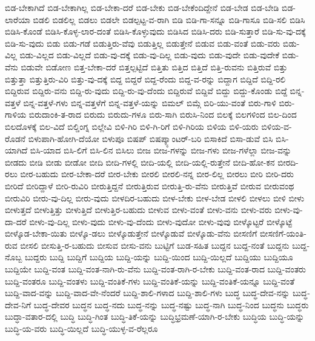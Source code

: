 {ಬಿಡ-ಬೇಕಾಗಿದೆ
ಬಿಡ-ಬೇಕಾಗಿಲ್ಲ
ಬಿಡ-ಬೇಕಾ-ದರೆ
ಬಿಡ-ಬೇಕು
ಬಿಡ-ಬೇಕೆಂದಿದ್ದೇನೆ
ಬಿಡ-ಬೇಡ
ಬಿಡ-ಬೇಡಿ
ಬಿಡ-ಲಾರೆಯಾ
ಬಿಡಲಿ
ಬಿಡಲಿಲ್ಲ
ಬಿಡಲು
ಬಿಡಲೇ
ಬಿಡಲ್ಪಟ್ಟ-ವ-ರಾಗಿ
ಬಿಡಿ
ಬಿಡಿ-ಗಾ-ಸನ್ನೂ
ಬಿಡಿ-ಗಾಸೂ
ಬಿಡಿ-ಸಲಿ
ಬಿಡಿಸಿ
ಬಿಡಿಸಿ-ಕೊಂಡೆ
ಬಿಡಿಸಿ-ಕೊಳ್ಳ-ಲಾರ-ದಂತೆ
ಬಿಡಿಸಿ-ಕೊಳ್ಳುವುದು
ಬಿಡಿಸಿದ
ಬಿಡಿಸಿ-ದರು
ಬಿಡಿ-ಸುತ್ತಾರೆ
ಬಿಡಿ-ಸು-ವು-ದಕ್ಕೆ
ಬಿಡಿ-ಸು-ವುದು
ಬಿಡು
ಬಿಡು-ಗಡೆ
ಬಿಡುತ್ತಿರು-ವೆವು
ಬಿಡುತ್ತಿಲ್ಲ
ಬಿಡುತ್ತೇನೆ
ಬಿಡುವ
ಬಿಡು-ವಂತೆ
ಬಿಡು-ವರು
ಬಿಡು-ವಿಲ್ಲ
ಬಿಡು-ವಿಲ್ಲದ
ಬಿಡು-ವಿಲ್ಲದೆ
ಬಿಡು-ವು-ದಕ್ಕೆ
ಬಿಡು-ವು-ದಿಲ್ಲ
ಬಿಡು-ವುದು
ಬಿಡು-ವುದೇ
ಬಿಡು-ವುದೇಕೆ
ಬಿಡು-ವೆನು
ಬಿಡುವೇ
ಬಿಡೋಣ
ಬಿತ್ತ-ಬೇಕಾ-ದರೆ
ಬಿತ್ತಲ್ಪಟ್ಟಿದೆ
ಬಿತ್ತಿತು
ಬಿತ್ತಿದ
ಬಿತ್ತಿದೆ
ಬಿತ್ತಿ-ರುವನು
ಬಿತ್ತಿರುವೆ
ಬಿತ್ತು
ಬಿತ್ತುತ್ತಾ
ಬಿತ್ತುತ್ತಿರು-ವಿರಿ
ಬಿತ್ತು-ವು-ದಕ್ಕೆ
ಬಿದ್ದ
ಬಿದ್ದರೆ
ಬಿದ್ದ-ರೆಂದು
ಬಿದ್ದ-ವ-ರನ್ನು
ಬಿದ್ದಾಗ
ಬಿದ್ದಿದೆ
ಬಿದ್ದಿ-ರಲಿ
ಬಿದ್ದಿರುವ
ಬಿದ್ದಿರು-ವನು
ಬಿದ್ದಿ-ರು-ವುದು
ಬಿದ್ದಿ-ರು-ವು-ದೆಂದು
ಬಿದ್ದಿರುವೆ
ಬಿದ್ದಿವೆ
ಬಿದ್ದು
ಬಿದ್ದು-ಕೊಂಡು
ಬಿದ್ದೆ
ಬಿನ್ನ-ವತ್ತಳೆ
ಬಿನ್ನ-ವತ್ತಳೆ-ಗಳು
ಬಿನ್ನ-ವತ್ತಳೆಗೆ
ಬಿನ್ನ-ವತ್ತಳೆ-ಯನ್ನು
ಬಿಮಲ್
ಬಿಮ್ಗೆ
ಬಿರಿ-ಯು-ವಂತೆ
ಬಿರು-ಗಾಳಿ
ಬಿರು-ಗಾಳಿಯ
ಬಿರುದಾಂಕಿ-ತ-ರಾದ
ಬಿರುದು
ಬಿರುದು-ಗಳೂ
ಬಿರು-ಸಾಗಿ
ಬಿರುಸಿ-ನಿಂದ
ಬಿಲಕ್ಕೆ
ಬಿಲಗಳಿಂದ
ಬಿಲ-ದಿಂದ
ಬಿಲದೊಳಕ್ಕೆ
ಬಿಲ-ವಿದೆ
ಬಿಲ್ಡಿಂಗ್ನ
ಬಿಲ್ಲೇವಿ
ಬಿಳಿ-ಗಿರಿ
ಬಿಳಿ-ಗಿ-ರಿಗೆ
ಬಿಳಿ-ಗಿರಿಯ
ಬಿಳಿಯ
ಬಿಳಿ-ಯರು
ಬಿಳಿಯ-ವ-ರೊಡನೆ
ಬಿಳುಪಾಗಿ-ಹೋಗಿ-ದೆಯೋ
ಬಿಳುಪೂ
ಬಿಷಪ್
ಬಿಷಪ್ಕ್ಯಾಂಟರ್-ಬರಿ
ಬಿಸಾಕಿದೆ
ಬಿಸಾ-ಡುವೆ
ಬಿಸಿ
ಬಿಸಿ-ಯಾಗಿದೆ
ಬಿಸಿ-ಯಾದ
ಬಿಸಿ-ಲಿಗೆ
ಬಿಸಿ-ಲಿನ
ಬಿಸಿಲು
ಬೀಜ
ಬೀಜ-ಗಳನ್ನು
ಬೀಜ-ಗಳು
ಬೀಜ-ಗಳೆಲ್ಲಾ
ಬೀಜ-ವನ್ನು
ಬೀಡದು
ಬೀಡಿ
ಬೀಡು
ಬೀಡೋ
ಬೀದಿ
ಬೀದಿ-ಗಳಲ್ಲಿ
ಬೀದಿ-ಯಲ್ಲಿ
ಬೀದಿ-ಯಲ್ಲಿ-ರುತ್ತೇನೆ
ಬೀದಿ-ಹೋ-ಕನ
ಬೀರದಿ-ರಲು
ಬೀರ-ಬಹುದು
ಬೀರ-ಬೇಕಾ-ದರೆ
ಬೀರ-ಬೇಕು
ಬೀರಲಿ
ಬೀರಲಿ-ನನ್ನ
ಬೀರ-ಲಿಲ್ಲ
ಬೀರಲು
ಬೀರಿ
ಬೀರಿ-ದರು
ಬೀರಿದೆ
ಬೀರಿದ್ದಾಳೆ
ಬೀರಿ-ರುವಿರಿ
ಬೀರುತ್ತಿದ್ದನೆ
ಬೀರುತ್ತಿರುವ
ಬೀರುತ್ತಿ-ರು-ವೆನು
ಬೀರುತ್ತಿವೆ
ಬೀರುವ
ಬೀರುವಂಥ
ಬೀರುವಿರಿ
ಬೀರು-ವು-ದಿಲ್ಲ
ಬೀರು-ವುದು
ಬೀಳದಿರ-ಬಹುದು
ಬೀಳ-ಬೇಕು
ಬೀಳ-ಬೇಡ
ಬೀಳಲಿ
ಬೀಳಲು
ಬೀಳಿ
ಬೀಳು
ಬೀಳುತ್ತದೆ
ಬೀಳುತ್ತಿತ್ತು
ಬೀಳುತ್ತಿದೆ
ಬೀಳುತ್ತಿರ-ಬಹುದು
ಬೀಳುವ
ಬೀಳು-ವಂತೆ
ಬೀಳು-ವನು
ಬೀಳು-ವರು
ಬೀಳು-ವು-ದಾ-ದರೆ
ಬೀಳು-ವು-ದಿಲ್ಲ
ಬೀಳು-ವುದು
ಬೀಳು-ವು-ದೆಂದು
ಬೀಳು-ವುದೋ
ಬೀಳು-ವುವು
ಬೀಳ್ಕೊಟ್ಟರೆ
ಬೀಳ್ಕೊಟ್ಟೆ
ಬೀಳ್ಕೊಡ-ಬೇಕಾ-ಯಿತು
ಬೀಳ್ಕೊ-ಡಲು
ಬೀಳ್ಕೊಡುತ್ತೇನೆ
ಬೀಳ್ಕೊಡುವೆ
ಬೀಳ್ಕೊಡು-ವೆನು
ಬೀಸಣಿಗೆ
ಬೀಸಣಿಗೆ-ಯಂತಿ-ರುವ
ಬೀಸಲಿ
ಬೀಸುತ್ತಿ-ರ-ಬಹುದು
ಬೀಸುವ
ಬೀಸು-ವನು
ಬುಟ್ಟಿಗೆ
ಬುಡ-ಸಹಿತ
ಬುದ್ದನ
ಬುದ್ದ-ನಂತೆ
ಬುದ್ದನು
ಬುದ್ದ-ನೊಬ್ಬ
ಬುದ್ದರು
ಬುದ್ದಿ
ಬುದ್ದಿಗೆ
ಬುದ್ದಿಯ
ಬುದ್ದಿ-ಯನ್ನು
ಬುದ್ದಿ-ಯಿಂದ
ಬುದ್ದಿ-ಯಿಲ್ಲದೆ
ಬುದ್ದಿಯು
ಬುದ್ದಿಯೂ
ಬುದ್ದಿಯೇ
ಬುದ್ದಿ-ವಂತ
ಬುದ್ದಿ-ವಂತ-ನಾಗಿ-ರು-ವೆನು
ಬುದ್ದಿ-ವಂತ-ರಾಗಿ-ರ-ಬೇಕು
ಬುದ್ದಿ-ವಂತ-ರಾದ
ಬುದ್ದಿ-ವಂತರು
ಬುದ್ದಿ-ವಂತರೂ
ಬುದ್ದಿ-ವಂತಳು
ಬುದ್ದಿ-ವಂತಿಕೆ-ಗಳು
ಬುದ್ದಿ-ವಂತಿಕೆ-ಯನ್ನು
ಬುದ್ದಿ-ವಂತಿಕೆ-ಯನ್ನೂ
ಬುದ್ದಿ-ವಂತೆ
ಬುದ್ದಿ-ವಾದ-ವನ್ನು
ಬುದ್ದಿ-ವಾದ-ವೇ-ನೆಂದರೆ
ಬುದ್ದಿ-ಶಾಲಿ-ಗಳಾದ
ಬುದ್ದಿ-ಶಾಲಿ-ಗಳು
ಬುದ್ಧ
ಬುದ್ಧ-ದೇವ-ನನ್ನು
ಬುದ್ಧ-ದೇವ-ನಿಗೆ
ಬುದ್ಧ-ದೇವರ
ಬುದ್ಧನ
ಬುದ್ಧ-ನದು
ಬುದ್ಧ-ನನ್ನು
ಬುದ್ಧ-ನಷ್ಟು
ಬುದ್ಧ-ನಾಗಿ
ಬುದ್ಧ-ನಿಂದ
ಬುದ್ಧನು
ಬುದ್ಧರು
ಬುದ್ಧಾ-ವತಾರ-ದಲ್ಲಿ
ಬುದ್ಧಿ
ಬುದ್ಧಿ-ಗಿಂತ
ಬುದ್ಧಿ-ತಿಕೆ-ಯನ್ನು
ಬುದ್ಧಿಭ್ರಮಣೆ-ಯಾಗಿ-ರ-ಬೇಕು
ಬುದ್ಧಿಯ
ಬುದ್ಧಿ-ಯನ್ನು
ಬುದ್ಧಿ-ಯ-ವರು
ಬುದ್ಧಿ-ಯಿಲ್ಲದೆ
ಬುದ್ಧಿ-ಯುಳ್ಳ-ವ-ರೆಲ್ಲರೂ
}
